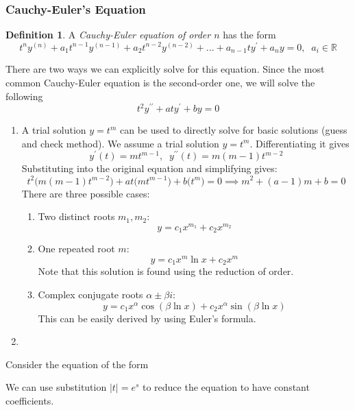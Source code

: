 \documentclass{article}
\theoremstyle{remark}
\theoremstyle{definition}
\newtheorem{definition}{Definition}[section]
\begin{document}
    \subsubsection{Cauchy-Euler's Equation}

      \begin{definition}
      A \textit{Cauchy-Euler equation of order $n$} has the form 
      \[t^n y^{(n)} + a_1 t^{n-1} y^{(n-1)} + a_2 t^{n-2} y^{(n-2)} + ... + a_{n-1} t y^\prime + a_n y = 0, \;\; a_i \in \mathbb{R}\]
      \end{definition}

      There are two ways we can explicitly solve for this equation. Since the most common Cauchy-Euler equation is the second-order one, we will solve the following 
      \[t^2 y^{\prime \prime} + a t y^\prime + b y = 0\]
      \begin{enumerate}
          \item A trial solution $y = t^m$ can be used to directly solve for basic solutions (guess and check method). We assume a trial solution $y = t^m$. Differentiating it gives
          \[y^\prime (t) = m t^{m-1}, \;\; y^{\prime\prime} (t) = m (m-1) t^{m-2}\]
          Substituting into the original equation and simplifying gives: 
          \[t^2 \big( m(m-1)t^{m-2}\big) + at \big( m t^{m-1}\big) + b \big( t^m \big) = 0 \implies m^2 + (a-1) m + b = 0\]
          There are three possible cases: 
          \begin{enumerate}
              \item Two distinct roots $m_1, m_2$: 
              \[y = c_1 x^{m_1} + c_2 x^{m_2}\]
              \item One repeated root $m$: 
              \[y = c_1 x^m \ln{x} + c_2 x^m\]
              Note that this solution is found using the reduction of order. 
              \item Complex conjugate roots $\alpha \pm \beta i$: 
              \[y = c_1 x^{\alpha} \cos(\beta \ln{x}) + c_2 x^\alpha \sin(\beta \ln{x})\] 
              This can be easily derived by using Euler's formula. 
          \end{enumerate}
          \item 
      \end{enumerate}


      Consider the equation of the form 

      We can use substitution $|t| = e^s$ to reduce the equation to have constant coefficients. 
\end{document}
